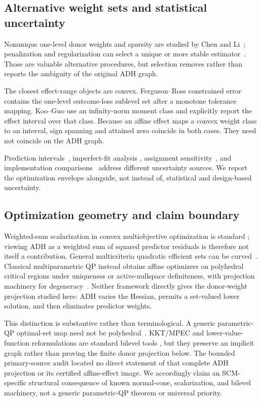 \documentclass[10pt]{article}
\theoremstyle{definition}
\begin{document}
\subsection{Alternative weight sets and statistical uncertainty}

Nonunique one-level donor weights and sparsity are studied by Chen and
Li~\cite{chenli2024}; penalization and regularization can select a unique or
more stable estimator~\cite{abadielhour2021,amjad2018,doudchenko2017}.  Those are
valuable alternative procedures, but selection removes rather than reports the
ambiguity of the original ADH graph.

The closest effect-range objects are convex.  Ferguson--Ross constrained error
contains the one-level outcome-loss sublevel set after a monotone tolerance
mapping.  Koo--Guo use an infinity-norm moment class and explicitly report the
effect interval over that class.  Because an affine effect maps a convex weight
class to an interval, sign spanning and attained zero coincide in both cases.
They need not coincide on the ADH graph.

Prediction intervals~\cite{cattaneo2021}, imperfect-fit analysis
\cite{fermanpinto2021}, assignment sensitivity~\cite{firpopossebom2018}, and
implementation comparisons~\cite{pickett2026} address different uncertainty
sources.  We report the optimization envelope alongside, not instead of,
statistical and design-based uncertainty.

\subsection{Optimization geometry and claim boundary}

Weighted-sum scalarization in convex multiobjective optimization is standard
\cite{ehrgott2005}; viewing ADH as a weighted sum of squared predictor
residuals is therefore not itself a contribution.  General multicriteria
quadratic efficient sets can be curved~\cite{gohyang1996}.  Classical
multiparametric QP instead obtains affine optimizers on polyhedral critical
regions under uniqueness or active-nullspace definiteness, with projection
machinery for degeneracy~\cite{tondel2003}.  Neither framework directly gives
the donor-weight projection studied here: ADH varies the Hessian, permits a
set-valued lower solution, and then eliminates predictor weights.

This distinction is substantive rather than terminological.  A generic
parametric-QP optimal-set map need not be polyhedral~\cite{klatte1985}.
KKT/MPEC and lower-value-function reformulations are standard bilevel tools
\cite{dempe2002}, but they preserve an implicit graph rather than proving the
finite donor projection below.  The bounded primary-source audit located no
direct statement of that complete ADH projection or its certified affine-effect
image.  We accordingly claim an SCM-specific structural consequence of known
normal-cone, scalarization, and bilevel machinery, not a generic parametric-QP
theorem or universal priority.
\end{document}

